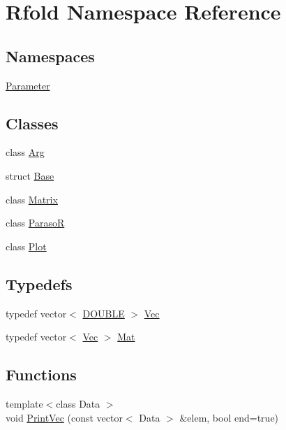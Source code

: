 \hypertarget{namespace_rfold}{\section{Rfold Namespace Reference}
\label{namespace_rfold}
}
\subsection*{Namespaces}
\begin{DoxyCompactItemize}
\item 
 \hyperlink{namespace_rfold_1_1_parameter}{Parameter}
\end{DoxyCompactItemize}
\subsection*{Classes}
\begin{DoxyCompactItemize}
\item 
class \hyperlink{class_rfold_1_1_arg}{Arg}
\item 
struct \hyperlink{struct_rfold_1_1_base}{Base}
\item 
class \hyperlink{class_rfold_1_1_matrix}{Matrix}
\item 
class \hyperlink{class_rfold_1_1_paraso_r}{Paraso\+R}
\item 
class \hyperlink{class_rfold_1_1_plot}{Plot}
\end{DoxyCompactItemize}
\subsection*{Typedefs}
\begin{DoxyCompactItemize}
\item 
typedef vector$<$ \hyperlink{energy__const_8hh_a8747af38b86aa2bbcda2f1b1aa0888c2}{D\+O\+U\+B\+L\+E} $>$ \hyperlink{namespace_rfold_aaf02f2c0c40c1dd572dbdd8bc1bde67d}{Vec}
\item 
typedef vector$<$ \hyperlink{namespace_rfold_aaf02f2c0c40c1dd572dbdd8bc1bde67d}{Vec} $>$ \hyperlink{namespace_rfold_a6392dbfbc164230455fdcdb1a0ff53d7}{Mat}
\end{DoxyCompactItemize}
\subsection*{Functions}
\begin{DoxyCompactItemize}
\item 
{\footnotesize template$<$class Data $>$ }\\void \hyperlink{namespace_rfold_a1a1302c55d28a19d8a6b27cee21dc5ac}{Print\+Vec} (const vector$<$ Data $>$ \&elem, bool end=true)
\end{DoxyCompactItemize}

